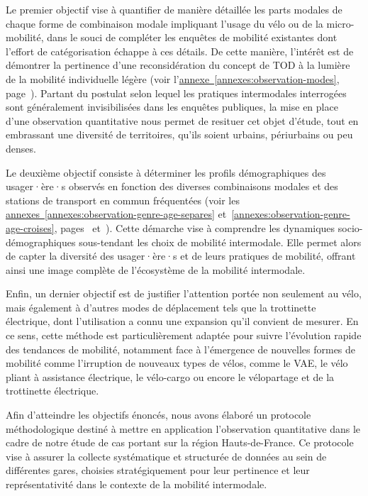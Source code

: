 \begin{refsegment}
Le premier objectif vise à quantifier de manière détaillée les parts modales de chaque forme de combinaison modale impliquant l'usage du vélo ou de la micro-mobilité, dans le souci de compléter les enquêtes de mobilité existantes dont l'effort de catégorisation échappe à ces détails. De cette manière, l'intérêt est de démontrer la pertinence d'une reconsidération du concept de \acrfull{TOD} à la lumière de la mobilité individuelle légère (voir l'\hyperref[annexes:observation-modes]{annexe~\ref{annexes:observation-modes}}, page~\pageref{annexes:observation-modes}). Partant du postulat selon lequel les pratiques intermodales interrogées sont généralement invisibilisées dans les enquêtes publiques, la mise en place d'une observation quantitative nous permet de resituer cet objet d'étude, tout en embrassant une diversité de territoires, qu'ils soient urbains, périurbains ou peu denses.%

Le deuxième objectif consiste à déterminer les profils démographiques des usager·ère·s observés en fonction des diverses combinaisons modales et des stations de transport en commun fréquentées (voir les \hyperref[annexes:observation-genre-age-separes]{annexes~\ref{annexes:observation-genre-age-separes}} et~\ref{annexes:observation-genre-age-croises}, pages~\pageref{annexes:observation-genre-age-separes} et~\pageref{annexes:observation-genre-age-croises}). Cette démarche vise à comprendre les dynamiques socio-démographiques sous-tendant les choix de mobilité intermodale. Elle permet alors de capter la diversité des usager·ère·s et de leurs pratiques de mobilité, offrant ainsi une image complète de l'écosystème de la mobilité intermodale.%

Enfin, un dernier objectif est de justifier l'attention portée non seulement au vélo, mais également à d'autres modes de déplacement tels que la trottinette électrique, dont l'utilisation a connu une expansion qu'il convient de mesurer. En ce sens, cette méthode est particulièrement adaptée pour suivre l'évolution rapide des tendances de mobilité, notamment face à l'émergence de nouvelles formes de mobilité comme l'irruption de nouveaux types de vélos, comme le \acrfull{VAE}, le vélo pliant à assistance électrique, le vélo-cargo ou encore le vélopartage et de la trottinette électrique.%

Afin d'atteindre les objectifs énoncés, nous avons élaboré un protocole méthodologique destiné à mettre en application l'observation quantitative dans le cadre de notre étude de cas portant sur la région Hauts-de-France. Ce protocole vise à assurer la collecte systématique et structurée de données au sein de différentes gares, choisies stratégiquement pour leur pertinence et leur représentativité dans le contexte de la mobilité intermodale.%


\end{refsegment}
